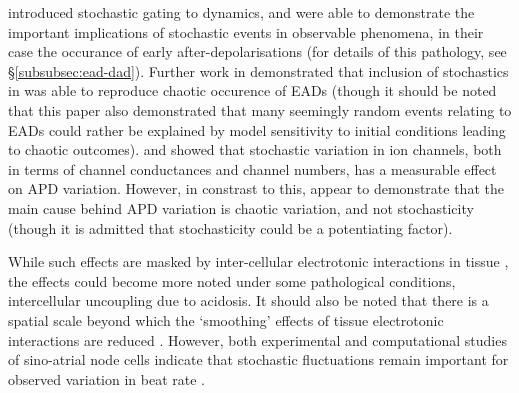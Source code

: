 \documentclass[../thesis-main.tex]{subfiles}
\begin{document}
\citet{Tanskanen2005} introduced stochastic gating to \ca{} dynamics, and were able to demonstrate the important implications of stochastic events in observable phenomena, in their case the occurance of early after-depolarisations (for details of this pathology, see \S\ref{subsubsec:ead-dad}). Further work in \citet{Sato2009} demonstrated that inclusion of stochastics in \iks{} was able to reproduce chaotic occurence of EADs (though it should be noted that this paper also demonstrated that many seemingly random events relating to EADs could rather be explained by model sensitivity to initial conditions leading to chaotic outcomes). \citet{Pueyo2011} and \citet{Lemay2011} showed that stochastic variation in ion channels, both in terms of channel conductances and channel numbers, has a measurable effect on APD variation. However, in constrast to this, \citet{Sato2010} appear to demonstrate that the main cause behind APD variation is chaotic variation, and not stochasticity (though it is admitted that stochasticity could be a potentiating factor).

While such effects are masked by inter-cellular electrotonic interactions in tissue \citep{Zaniboni2000, Heijman2013}, the effects could become more noted under some pathological conditions, \eg{} intercellular uncoupling due to acidosis. It should also be noted that there is a spatial scale beyond which the `smoothing' effects of tissue electrotonic interactions are reduced \citep{Xie2007, Sato2009}. However, both experimental and computational studies of sino-atrial node cells indicate that stochastic fluctuations remain important for observed variation in beat rate \citep{Ponard2007}.
\end{document}
